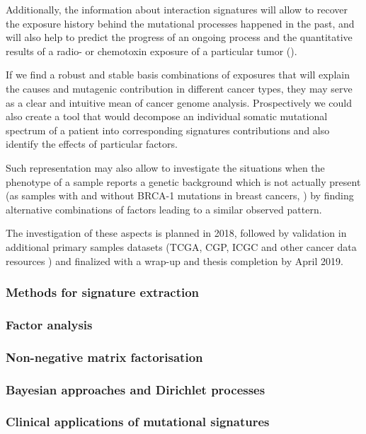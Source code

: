 Additionally, the information about interaction signatures will allow to recover the exposure history behind the mutational processes happened in the past, and will also help to predict the progress of an ongoing process and the quantitative results of a radio- or chemotoxin exposure of a particular tumor (\cite{Hollstein}).

If we find a robust and stable basis combinations of exposures that will explain the causes and mutagenic contribution in different cancer types, they may serve as a clear and intuitive mean of cancer genome analysis. Prospectively we could also create a tool that would decompose an individual somatic mutational spectrum of a patient into corresponding signatures contributions and also identify the effects of particular factors.

Such representation may also allow to investigate the situations when the phenotype of a sample reports a genetic background which is not actually present (as samples with and without BRCA-1 mutations in breast cancers, \cite{NZ2}) by finding alternative combinations of factors leading to a similar observed pattern.

The investigation of these aspects is planned in 2018, followed by validation in additional primary samples datasets (TCGA, CGP, ICGC and other cancer data resources \cite{Tian}) and finalized with a wrap-up and thesis completion by April 2019.






\subsubsection{Methods for signature extraction}

\subsubsection*{Factor analysis}

\subsubsection*{Non-negative matrix factorisation}

\subsubsection*{Bayesian approaches and Dirichlet processes}












\subsubsection{Clinical applications of mutational signatures}




